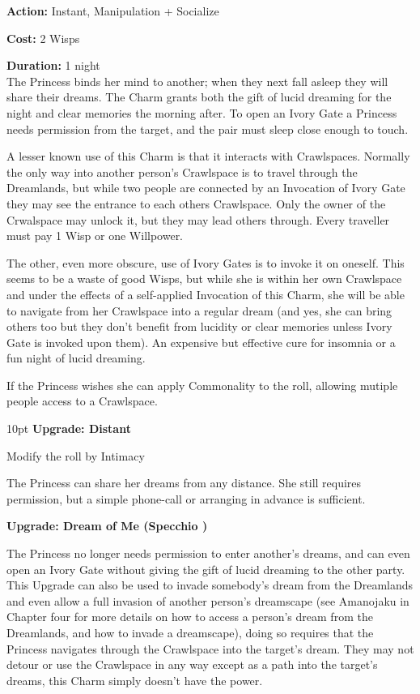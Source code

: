 \noindent \textbf{Action:} Instant, Manipulation + Socialize

\noindent \textbf{Cost:} 2 Wisps

\noindent \textbf{Duration:} 1 night \\

\noindent The Princess binds her mind to another; when they next fall asleep they will share their dreams. The Charm grants both the gift of lucid dreaming for the night and clear memories the morning after. To open an Ivory Gate a Princess needs permission from the target, and the pair must sleep close enough to touch.

A lesser known use of this Charm is that it interacts with Crawlspaces. Normally the only way into another person's Crawlspace is to travel through the Dreamlands, but while two people are connected by an Invocation of Ivory Gate they may see the entrance to each others Crawlspace. Only the owner of the Crwalspace may unlock it, but they may lead others through. Every traveller must pay 1 Wisp or one Willpower.  

The other, even more obscure, use of Ivory Gates is to invoke it on oneself. This seems to be a waste of good Wisps, but while she is within her own Crawlspace and under the effects of a self-applied Invocation of this Charm, she will be able to navigate from her Crawlspace into a regular dream (and yes, she can bring others too but they don't benefit from lucidity or clear memories unless Ivory Gate is invoked upon them). An expensive but effective cure for insomnia or a fun night of lucid dreaming. 

If the Princess wishes she can apply Commonality to the roll, allowing mutiple people access to a Crawlspace.

\begin{myindentpar}{10pt} \textbf{Upgrade: Distant}

\noindent Modify the roll by Intimacy

The Princess can share her dreams from any distance. She still requires permission, but a simple phone-call or arranging in advance is sufficient. 

\textbf{Upgrade: Dream of Me (Specchio \textbullet\textbullet)}

The Princess no longer needs permission to enter another's dreams, and can even open an Ivory Gate without giving the gift of lucid dreaming to the other party. This Upgrade can also be used to invade somebody's dream from the Dreamlands and even allow a full invasion of another person's dreamscape (see Amanojaku in Chapter four for more details on how to access a person's dream from the Dreamlands, and how to invade a dreamscape), doing so requires that the Princess navigates through the Crawlspace into the target's dream. They may not detour or use the Crawlspace in any way except as a path into the target's dreams, this Charm simply doesn’t have the power. 

\end{myindentpar}

